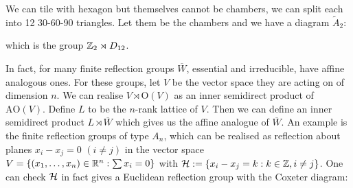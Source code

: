 \documentclass[../main.tex]{subfiles}
\begin{document}
We can tile with hexagon but themselves cannot be chambers, we can split each into 12 30-60-90 triangles. Let them be the chambers and we have a diagram $\tilde{A}_2$:

\begin{figure}[H]
\centering
{}
\end{figure}

which is the group $\mathbb{Z}_2 \rtimes D_{12}$.

In fact, for many finite reflection groups $\overline W$, essential and irreducible, have affine analogous ones. For these groups, let $V$ be the vector space they are acting on of dimension $n$. We can realise $V\rtimes\text{O}(V)$ as an inner semidirect product of $\text{AO}(V)$. Define $L$ to be the $n$-rank lattice of $V$. Then we can define an inner semidirect product $L\rtimes \overline W$ which gives us the affine analogue of $\overline W$. An example is the finite reflection groups of type $A_n$, which can be realised as reflection about planes $x_i-x_j=0$ $(i\neq j)$ in the vector space $V=\{(x_1,\dots,x_n)\in\mathbb{R}^n:\sum x_i=0\}$ with $\mathcal{H} := \{x_i-x_j=k:k\in \mathbb{Z}, i\neq j\}$. One can check $\mathcal{H}$ in fact gives a Euclidean reflection group with the Coxeter diagram:
\end{document}
